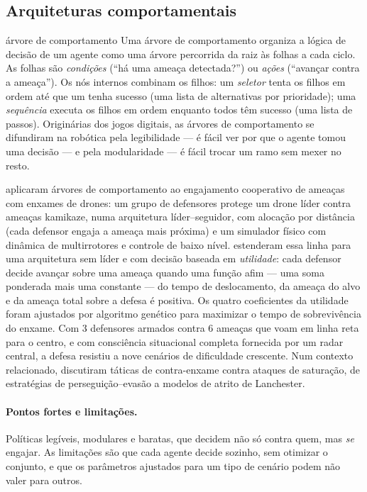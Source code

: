 \subsection{Arquiteturas comportamentais}

\begin{conceitobox}{árvore de comportamento}
Uma árvore de comportamento organiza a lógica de decisão de um agente como uma árvore percorrida da raiz às folhas a cada
ciclo. As folhas são \emph{condições} (``há uma ameaça detectada?'') ou \emph{ações} (``avançar contra a ameaça''). Os
nós internos combinam os filhos: um \emph{seletor} tenta os filhos em ordem até que um tenha sucesso (uma lista de
alternativas por prioridade); uma \emph{sequência} executa os filhos em ordem enquanto todos têm sucesso (uma lista de
passos). Originárias dos jogos digitais, as árvores de comportamento se difundiram na robótica pela legibilidade --- é fácil
ver por que o agente tomou uma decisão --- e pela modularidade --- é fácil trocar um ramo sem mexer no resto.
\end{conceitobox}

\citet{ricardo2023} aplicaram árvores de comportamento ao engajamento cooperativo de ameaças com enxames de drones: um
grupo de defensores protege um drone líder contra ameaças kamikaze, numa arquitetura líder--seguidor, com alocação por
distância (cada defensor engaja a ameaça mais próxima) e um simulador físico com dinâmica de multirrotores e controle de
baixo nível. \citet{feitosa2025} estenderam essa linha para uma arquitetura sem líder e com decisão baseada em
\emph{utilidade}: cada defensor decide avançar sobre uma ameaça quando uma função afim --- uma soma ponderada mais uma
constante --- do tempo de deslocamento, da ameaça do alvo e da ameaça total sobre a defesa é positiva. Os quatro
coeficientes da utilidade foram ajustados por algoritmo genético para maximizar o tempo de sobrevivência do enxame. Com 3
defensores armados contra 6 ameaças que voam em linha reta para o centro, e com consciência situacional completa fornecida
por um radar central, a defesa resistiu a nove cenários de dificuldade crescente. Num contexto relacionado,
\citet{strickland2018} discutiram táticas de contra-enxame contra ataques de saturação, de estratégias de
perseguição--evasão a modelos de atrito de Lanchester.

\paragraph{Pontos fortes e limitações.} Políticas legíveis, modulares e baratas, que decidem não só contra quem, mas
\emph{se} engajar. As limitações são que cada agente decide sozinho, sem otimizar o conjunto, e que os parâmetros ajustados
para um tipo de cenário podem não valer para outros.

